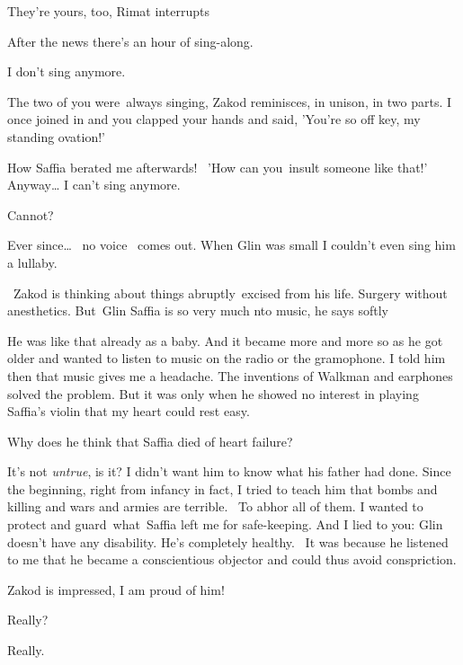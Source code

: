 \documentclass[12pt]{book}
\begin{document}
{\textquotedbl}They're yours, too,{\textquotedbl} Rimat interrupts

{\textquotedbl}After the news there's an hour of sing-along.{\textquotedbl}

{\textquotedbl}I don't sing anymore.{\textquotedbl}

{\textquotedbl}The two of you were~always singing,{\textquotedbl} Zakod reminisces, {\textquotedbl}in unison, in two
parts. I once joined in and you clapped your hands and said, 'You're so off key, my standing ovation!'{\textquotedbl}

{\textquotedbl}How Saffia berated me afterwards! \ {}'How can you~insult someone like that!' Anyway{\dots} I can't sing
anymore.{\textquotedbl}

{\textquotedbl}Cannot?{\textquotedbl}

{\textquotedbl}Ever since{\dots} ~no voice ~comes out. When Glin was small I couldn't even sing him a
lullaby.{\textquotedbl}

~Zakod is thinking about things abruptly~excised from his life. Surgery without anesthetics. {\textquotedbl}But~Glin
Saffia is so very much nto music,{\textquotedbl} he says softly

{\textquotedbl}He was like that already as a baby. And it became more and more so as he got older and wanted to listen
to music on the radio or the gramophone. I told him then that music gives me a headache. The inventions of Walkman and
earphones solved the problem. But it was only when he showed no interest in playing Saffia's violin that my heart could
rest easy.{\textquotedbl}

{\textquotedbl}Why does he think that Saffia died of heart failure?{\textquotedbl} ~

{\textquotedbl}It's not\textit{ untrue}, is it? I didn't want him to know what his father had done. Since the beginning,
right from infancy in fact, I tried to teach him that bombs and killing and wars and armies are terrible.~ To abhor all
of them. I wanted to protect and guard~what~Saffia left me for safe-keeping. And I lied to you: Glin doesn't have any
disability. He's completely healthy. ~It was because he listened to me that he became a conscientious objector and
could thus avoid conspriction.{\textquotedbl}{ }

Zakod is impressed, {\textquotedbl}I am proud of him!{\textquotedbl}

{\textquotedbl}Really?{\textquotedbl}

{\textquotedbl}Really.{\textquotedbl}~
\end{document}
